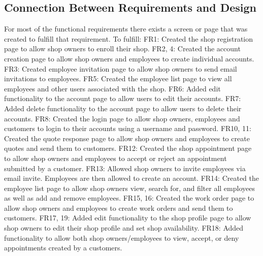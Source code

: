 \documentclass[12pt, titlepage]{article}
\begin{document}
\subsection{Connection Between Requirements and Design} \label{SecConnection}
For most of the functional requirements there exists a screen or page that was created to fulfill that requirement. 
\newline
To fulfill:
\newline
FR1: Created the shop registration page to allow shop owners to enroll their shop.
\newline
FR2, 4: Created the account creation page to allow shop owners and employees to create individual accounts.
\newline
FR3: Created employee invitation page to allow shop owners to send email invitations to employees.
\newline
FR5: Created the employee list page to view all employees and other users associated with the shop.
\newline
FR6: Added edit functionality to the account page to allow users to edit their accounts.
\newline
FR7: Added delete functionality to the account page to allow users to delete their accounts.
\newline
FR8: Created the login page to allow shop owners, employees and customers to login to their accounts using a username and password.
\newline
FR10, 11: Created the quote response page to allow shop owners and employees to create quotes and send them to customers.
\newline
FR12: Created the shop appointment page to allow shop owners and employees to accept or reject an appointment submitted by a customer.
\newline
FR13: Allowed shop owners to invite employees via email invite. Employees are then allowed to create an account.
\newline
FR14: Created the employee list page to allow shop owners view, search for, and filter all employees as well as add and remove employees.
\newline
FR15, 16: Created the work order page to allow shop owners and employees to create work orders and send them to customers.
\newline
FR17, 19: Added edit functionality to the shop profile page to allow shop owners to edit their shop profile and set shop availability.
\newline
FR18: Added functionality to allow both shop owners/employees to view,  accept, or deny appointments created by a customers.
\end{document}
